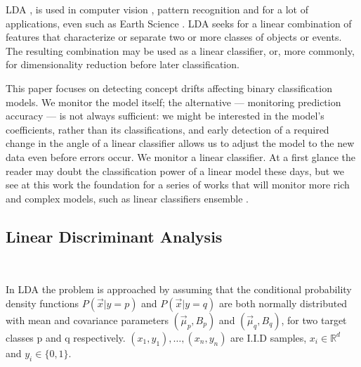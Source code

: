 \documentclass[11pt,twocolumn,varwidth=true,a4paper,fleqn]{article}
\begin{document}
\par LDA \cite{fisher1936use}, is used in computer vision
\cite{turk1991eigenfaces}, pattern recognition \cite{duda2012pattern} and
for a lot of applications, even such as Earth Science
\cite{tahmasebi2010application}.
LDA seeks for a linear combination of features that
characterize or separate two or more classes of objects or events.
The resulting combination may be used as a linear classifier, or, 
more commonly, for dimensionality reduction before later classification.

\par
This paper focuses on detecting concept drifts affecting binary 
classification models.
We monitor the model itself; the alternative --- monitoring prediction
accuracy --- is not always sufficient: we might be interested in the model's
coefficients, rather than its classifications, and early detection of a
required change in the angle of a linear classifier allows us to adjust 
the model to the new data even before errors occur.
We monitor a linear classifier. At a first glance the reader may doubt the
classification power of a linear model these days, but we see at this work the
foundation for a series of works that will monitor more rich and complex
models, such as linear classifiers ensemble \cite{osadchy2015k}.
\subsection{Linear Discriminant Analysis}
\\\par In LDA the problem is approached by assuming that the conditional probability
density functions $P(\vec x|y=p)$ and $P(\vec x|y=q)$ are both normally distributed with 
mean and covariance parameters $\left(\vec \mu_p, B_p\right)$ and 
$\left(\vec \mu_q, B_q\right)$, for two target classes p and q respectively.
${(x_1,y_1),\ldots,(x_n,y_n)}$ are I.I.D samples, $x_i \in \mathbb{R}^d$
and $y_i \in \{0,1\}$. 
\end{document}
